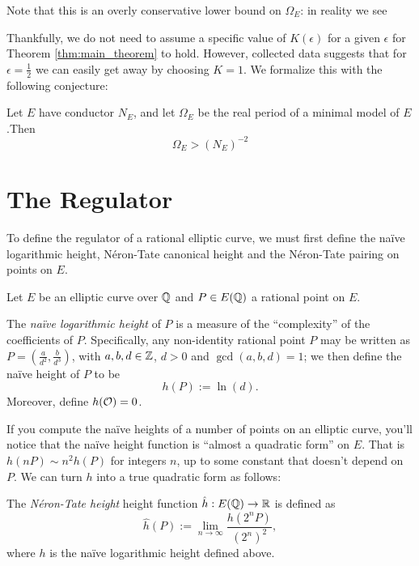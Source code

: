 \documentclass[10pt]{article}
\begin{document}
Note that this is an overly conservative lower bound on $\Omega_E$: in reality we see

Thankfully, we do not need to assume a specific value of $K(\epsilon)$ for a given $\epsilon$ for Theorem \ref{thm:main_theorem} to hold. However, collected data suggests that for $\epsilon=\frac{1}{2}$ we can easily get away by choosing $K = 1$. We formalize this with the following conjecture:
\begin{conjecture}
Let $E$ have conductor $N_E$, and let $\Omega_E$ be the real period of a minimal model of $E$.Then 
\begin{equation}
\Omega_E > (N_E)^{-2}
\end{equation}
\end{conjecture}



\newpage
\section{The Regulator}

To define the regulator of a rational elliptic curve, we must first define the na\"ive logarithmic height, N\'eron-Tate canonical height and the N\'eron-Tate pairing on points on $E$.

Let $E$ be an elliptic curve over $\mathbb{Q}$ and $P \in E(\mathbb{Q})$ a rational point on $E$. 

\begin{definition}
The {\it na\"ive logarithmic height} of $P$ is a measure of the ``complexity'' of the coefficients of $P$. Specifically, any non-identity rational point $P$ may be written as $P = (\frac{a}{d^2},\frac{b}{d^3})$, with $a,b,d \in \mathbb{Z}$, $d>0$ and $\gcd(a,b,d) = 1$; we then define the na\"ive height of $P$ to be
\begin{equation}
	h(P) := \ln(d).
\end{equation}
Moreover, define $h(\mathcal{O}) = 0$.
\end{definition}
If you compute the na\"ive heights of a number of points on an elliptic curve, you'll notice that the na\"ive height function is ``almost a quadratic form'' on $E$. That is $h(nP) \sim n^2 h(P)$ for integers $n$, up to some constant that doesn't depend on $P$. We can turn $h$ into a true quadratic form as follows:

\begin{definition}
The {\it N\'eron-Tate height} height function $\hat{h}: E(\mathbb{Q}) \to \mathbb{R}$ is defined as
\begin{equation}
	\hat{h}(P) := \lim_{n \to \infty} \frac{h(2^n P)}{(2^n)^2},
\end{equation}
where $h$ is the na\"ive logarithmic height defined above.
\end{definition}
\end{document}

